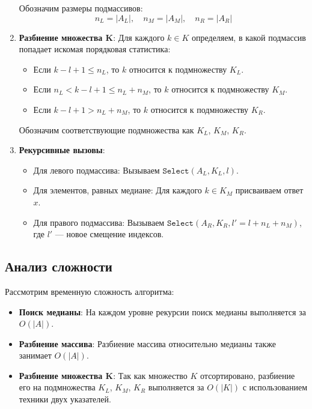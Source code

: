 \documentclass[11pt]{article}
\renewcommand{\leq}{\leqslant}  %
\begin{document}
\begin{solution}
\begin{enumerate}
              Обозначим размеры подмассивов:
              \[
                  n_L = |A_L|, \quad n_M = |A_M|, \quad n_R = |A_R|
              \]

        \item \textbf{Разбиение множества K}: Для каждого $k \in K$ определяем, в какой подмассив попадает искомая порядковая статистика:

              \begin{itemize}
                  \item Если $k - l + 1 \leq n_L$, то $k$ относится к подмножеству $K_L$.
                  \item Если $n_L < k - l + 1 \leq n_L + n_M$, то $k$ относится к подмножеству $K_M$.
                  \item Если $k - l + 1 > n_L + n_M$, то $k$ относится к подмножеству $K_R$.
              \end{itemize}

              Обозначим соответствующие подмножества как $K_L$, $K_M$, $K_R$.

        \item \textbf{Рекурсивные вызовы}:
              \begin{itemize}
                  \item Для левого подмассива: Вызываем $\texttt{Select}(A_L, K_L, l)$.
                  \item Для элементов, равных медиане: Для каждого $k \in K_M$ присваиваем ответ $x$.
                  \item Для правого подмассива: Вызываем $\texttt{Select}(A_R, K_R, l' = l + n_L + n_M)$, где $l'$ — новое смещение индексов.
              \end{itemize}
    \end{enumerate}

    \subsection*{Анализ сложности}

    Рассмотрим временную сложность алгоритма:

    \begin{itemize}
        \item \textbf{Поиск медианы}: На каждом уровне рекурсии поиск медианы выполняется за $O(|A|)$.
        \item \textbf{Разбиение массива}: Разбиение массива относительно медианы также занимает $O(|A|)$.
        \item \textbf{Разбиение множества K}: Так как множество $K$ отсортировано, разбиение его на подмножества $K_L$, $K_M$, $K_R$ выполняется за $O(|K|)$ с использованием техники двух указателей.
    \end{itemize}


\end{solution}
\end{document}
